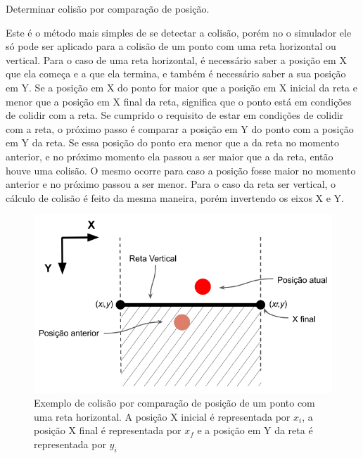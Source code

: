 \begin{alineas}[leftmargin=0pt, itemindent=20pt, labelwidth=15pt, labelsep=5pt, listparindent=1.25cm, align=left]
    \item Determinar colisão por comparação de posição.
    
    Este é o método mais simples de se detectar a colisão, porém no o simulador ele só pode ser aplicado para a colisão de um ponto com uma reta horizontal ou vertical. Para o caso de uma reta horizontal, é necessário saber a posição em X que ela começa e a que ela termina, e também é necessário saber a sua posição em Y. Se a posição em X do ponto for maior que a posição em X inicial da reta e menor que a posição em X final da reta, significa que o ponto está em condições de colidir com a reta. Se cumprido o requisito de estar em condições de colidir com a reta, o próximo passo é comparar a posição em Y do ponto com a posição em Y da reta. Se essa posição do ponto era menor que a da reta no momento anterior, e no próximo momento ela passou a ser maior que a da reta, então houve uma colisão. O mesmo ocorre para caso a posição fosse maior no momento anterior e no próximo passou a ser menor. Para o caso da reta ser vertical, o cálculo de colisão é feito da mesma maneira, porém invertendo os eixos X e Y.
    
    \begin{figure}[!htb]
        \caption{\label{img:colisao_simples}Exemplo de colisão por comparação de posição de um ponto com uma reta horizontal. A posição X inicial é representada por $x_i$, a posição X final é representada por $x_f$ e a posição em Y da reta é representada por $y_i$}
    	\begin{center}
            \includegraphics[scale=0.7]{img/colisao_simples.png}
    	\end{center}
    \end{figure}
    

\end{alineas}
